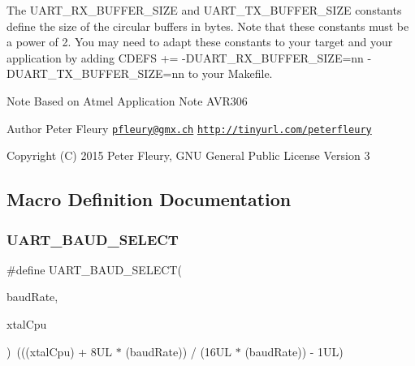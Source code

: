 The U\+A\+R\+T\+\_\+\+R\+X\+\_\+\+B\+U\+F\+F\+E\+R\+\_\+\+S\+I\+ZE and U\+A\+R\+T\+\_\+\+T\+X\+\_\+\+B\+U\+F\+F\+E\+R\+\_\+\+S\+I\+ZE constants define the size of the circular buffers in bytes. Note that these constants must be a power of 2. You may need to adapt these constants to your target and your application by adding C\+D\+E\+FS += -\/\+D\+U\+A\+R\+T\+\_\+\+R\+X\+\_\+\+B\+U\+F\+F\+E\+R\+\_\+\+S\+I\+ZE=nn -\/\+D\+U\+A\+R\+T\+\_\+\+T\+X\+\_\+\+B\+U\+F\+F\+E\+R\+\_\+\+S\+I\+ZE=nn to your Makefile.

\begin{DoxyNote}{Note}
Based on Atmel Application Note A\+V\+R306 
\end{DoxyNote}
\begin{DoxyAuthor}{Author}
Peter Fleury \href{mailto:pfleury@gmx.ch}{\tt pfleury@gmx.\+ch} \href{http://tinyurl.com/peterfleury}{\tt http\+://tinyurl.\+com/peterfleury} 
\end{DoxyAuthor}
\begin{DoxyCopyright}{Copyright}
(C) 2015 Peter Fleury, G\+NU General Public License Version 3 
\end{DoxyCopyright}


\subsection{Macro Definition Documentation}
\mbox{\label{group__pfleury__uart_ga367ff7b5de225ed936a63239ad4adb0b}} 
\subsubsection{\texorpdfstring{U\+A\+R\+T\+\_\+\+B\+A\+U\+D\+\_\+\+S\+E\+L\+E\+CT}{UART\_BAUD\_SELECT}}
{\footnotesize\ttfamily \#define U\+A\+R\+T\+\_\+\+B\+A\+U\+D\+\_\+\+S\+E\+L\+E\+CT(\begin{DoxyParamCaption}\item[{}]{baud\+Rate,  }\item[{}]{xtal\+Cpu }\end{DoxyParamCaption})~(((xtal\+Cpu) + 8\+U\+L $\ast$ (baud\+Rate)) / (16\+U\+L $\ast$ (baud\+Rate)) -\/ 1\+U\+L)}



